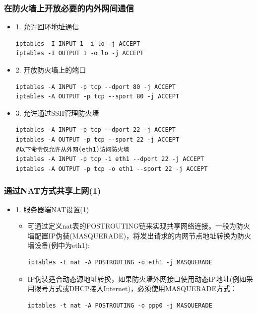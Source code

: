 \documentclass[xcolor=svgnames,presentation]{beamer}
\begin{document}
\begin{frame}[fragile]
\frametitle{在防火墙上开放必要的内外网间通信}
\label{sec-3-3}
\begin{itemize}

\item 1. 允许回环地址通信\\
\label{sec-3-3-1}%
\begin{verbatim}
iptables -I INPUT 1 -i lo -j ACCEPT
iptables -I OUTPUT 1 -o lo -j ACCEPT
\end{verbatim}

\item 2. 开放防火墙上的端口\\
\label{sec-3-3-2}%
\begin{verbatim}
iptables -A INPUT -p tcp --dport 80 -j ACCEPT
iptables -A OUTPUT -p tcp --sport 80 -j ACCEPT
\end{verbatim}

\item 3. 允许通过SSH管理防火墙\\
\label{sec-3-3-3}%
\begin{verbatim}
iptables -A INPUT -p tcp --dport 22 -j ACCEPT
iptables -A OUTPUT -p tcp --sport 22 -j ACCEPT
#以下命令仅允许从外网(eth1)访问防火墙
iptables -A INPUT -p tcp -i eth1 --dport 22 -j ACCEPT
iptables -A OUTPUT -p tcp -o eth1 --sport 22 -j ACCEPT
\end{verbatim}
\end{itemize} %
\end{frame}
\begin{frame}[fragile]
\frametitle{通过NAT方式共享上网(1)}
\label{sec-3-4}
\begin{itemize}

\item 1. 服务器端NAT设置(1)
\label{sec-3-4-1}%
\begin{itemize}

\item 可通过定义nat表的POSTROUTING链来实现共享网络连接。一般为防火墙配置IP伪装(MASQUERADE)，将发出请求的内网节点地址转换为防火墙设备(例中为eth1):\\
\label{sec-3-4-1-1}%
\begin{verbatim}
iptables -t nat -A POSTROUTING -o eth1 -j MASQUERADE
\end{verbatim}

\item IP伪装适合动态源地址转换，如果防火墙外网接口使用动态IP地址(例如采用拨号方式或DHCP接入Internet)，必须使用MASQUERADE方式：\\
\label{sec-3-4-1-2}%
\begin{verbatim}
iptables -t nat -A POSTROUTING -o ppp0 -j MASQUERADE
\end{verbatim}
\end{itemize} %
\end{itemize} %
\end{frame}
\end{document}
